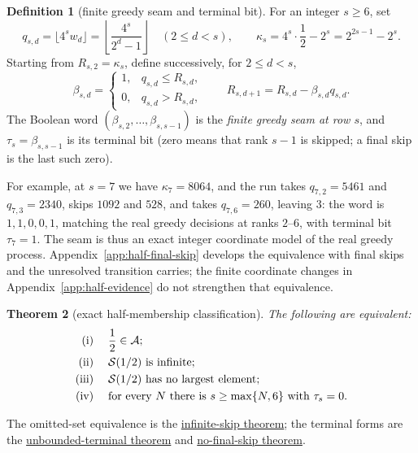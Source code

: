 \documentclass[11pt]{article}
\newcommand{\commit}{99f4bf47422abbd8757cbb22b50ba079d764d3a7}
\newcommand{\repobase}{https://github.com/wcook04/plectis-erdos/blob/\commit}
\newcommand{\PK}{Erdos249257}
\newcommand{\lword}[4]{\href{\repobase/\PK/#1\#L#2}{#4}}
\newtheorem{theorem}{Theorem}[section]
\theoremstyle{definition}
\newtheorem{definition}[theorem]{Definition}
\theoremstyle{remark}
\begin{document}
\begin{definition}[finite greedy seam and terminal bit]\label{def:terminal-bit}
For an integer \(s\geq6\), set
\[
 q_{s,d}=\lfloor4^sw_d\rfloor
 =\left\lfloor\frac{4^s}{2^d-1}\right\rfloor
 \quad(2\leq d<s),
 \qquad
 \kappa_s=4^s\cdot\frac12-2^s=2^{2s-1}-2^s.
\]
Starting from \(R_{s,2}=\kappa_s\), define successively, for \(2\leq d<s\),
\[
 \beta_{s,d}=
 \begin{cases}
  1,&q_{s,d}\leq R_{s,d},\\
  0,&q_{s,d}>R_{s,d},
 \end{cases}
 \qquad
 R_{s,d+1}=R_{s,d}-\beta_{s,d}q_{s,d}.
\]
The Boolean word \((\beta_{s,2},\ldots,\beta_{s,s-1})\) is the
\emph{finite greedy seam at row \(s\)}, and
\(\tau_s=\beta_{s,s-1}\) is its terminal bit (zero means that rank \(s-1\)
is skipped; a final skip is the last such zero).
\end{definition}

\noindent For example, at \(s=7\) we have \(\kappa_7=8064\), and the run takes
\(q_{7,2}=5461\)
and \(q_{7,3}=2340\), skips \(1092\) and \(528\), and takes
\(q_{7,6}=260\), leaving \(3\): the word is \(1,1,0,0,1\), matching the
real greedy decisions at ranks \(2\)--\(6\), with terminal bit
\(\tau_7=1\).  The seam
is thus an exact integer coordinate model of the real greedy process.
Appendix~\ref{app:half-final-skip} develops the equivalence with
final skips and the unresolved transition carries; the finite coordinate changes in
Appendix~\ref{app:half-evidence} do not strengthen that equivalence.

\begin{theorem}[exact half-membership classification]\label{res:halfmembership}
The following are equivalent:
\[
\begin{aligned}
\textup{(i)}\;&\quad \frac12\in\mathcal A;\\
\textup{(ii)}\;&\quad \mathcal S(1/2)\ \text{is infinite};\\
\textup{(iii)}\;&\quad \mathcal S(1/2)\ \text{has no largest element};\\
\textup{(iv)}\;&\quad
  \text{for every }N\text{ there is }s\geq\max\{N,6\}
  \text{ with }\tau_s=0.
\end{aligned}
\]
\end{theorem}
\noindent The omitted-set equivalence is the
\lword{GreedyAchievementSet.lean}{2583}{half_mem_mersenneAchievementSet_iff_greedySkippedSupport_infinite}{infinite-skip theorem};
the terminal forms are the
\lword{HalfCylinderHalfMembershipClassification.lean}{126}{half_mem_mersenneAchievementSet_iff_unboundedTerminalFalse}{unbounded-terminal theorem}
and
\lword{HalfCylinderHalfMembershipClassification.lean}{235}{half_mem_mersenneAchievementSet_iff_no_lastHalfGreedySkip}{no-final-skip theorem}.
\end{document}
